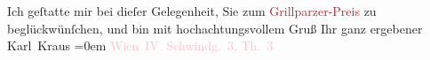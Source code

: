            \pstart
           Ich geſtatte mir bei dieſer Gelegenheit, Sie zum \textcolor{brown}{Grillparzer-Preis}{}\ledrightnote{\textcolor{brown}{Franz-Grillparzer-Preis}} zu beglückwünſchen, und bin mit hochachtungsvollem
               Gruß\pend
           \pstart
           Ihr ganz ergebener{\\[\baselineskip]}\spacefill\mbox{Karl Kraus}\pend
           \leftskip=0em{}\pstart
           \noindent{}\raggedleft{}\textcolor{pink}{Wien IV. Schwindg. 3, Th. 3}{}\ledrightnote{\textcolor{pink}{Schwindgasse}}\pend
           \endnumbering{}  
      